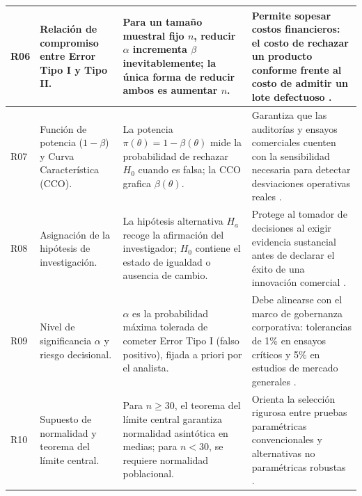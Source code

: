 {\begin{center}
\begin{longtable}{p{1.1cm}p{4.2cm}p{4.0cm}p{5.2cm}}
\midrule
R06 & Relación de compromiso entre Error Tipo I y Tipo II. & Para un tamaño muestral fijo $n$, reducir $\alpha$ incrementa $\beta$ inevitablemente; la única forma de reducir ambos es aumentar $n$. & Permite sopesar costos financieros: el costo de rechazar un producto conforme frente al costo de admitir un lote defectuoso \citep{anderson2012}. \\
\midrule
R07 & Función de potencia ($1-\beta$) y Curva Característica (CCO). & La potencia $\pi(\theta) = 1 - \beta(\theta)$ mide la probabilidad de rechazar $H_0$ cuando es falsa; la CCO grafica $\beta(\theta)$. & Garantiza que las auditorías y ensayos comerciales cuenten con la sensibilidad necesaria para detectar desviaciones operativas reales \citep{wackerly2010}. \\
\midrule
R08 & Asignación de la hipótesis de investigación. & La hipótesis alternativa $H_a$ recoge la afirmación del investigador; $H_0$ contiene el estado de igualdad o ausencia de cambio. & Protege al tomador de decisiones al exigir evidencia sustancial antes de declarar el éxito de una innovación comercial \citep{lind2012}. \\
\midrule
R09 & Nivel de significancia $\alpha$ y riesgo decisional. & $\alpha$ es la probabilidad máxima tolerada de cometer Error Tipo I (falso positivo), fijada a priori por el analista. & Debe alinearse con el marco de gobernanza corporativa: tolerancias de 1\% en ensayos críticos y 5\% en estudios de mercado generales \citep{nistHandbook}. \\
\midrule
R10 & Supuesto de normalidad y teorema del límite central. & Para $n \ge 30$, el teorema del límite central garantiza normalidad asintótica en medias; para $n < 30$, se requiere normalidad poblacional. & Orienta la selección rigurosa entre pruebas paramétricas convencionales y alternativas no paramétricas robustas \citep{spiegel2009}. \\
\end{longtable}
\end{center}


}
